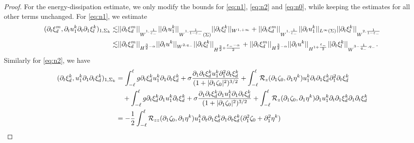 \documentclass[letterpaper,reqno,10pt,twoside]{amsart}
\theoremstyle{definition}
\theoremstyle{remark}
\def\p{\partial}
\begin{document}
\begin{proof}
		For the energy-dissipation estimate, we only modify the bounds for \eqref{eq:n1}, \eqref{eq:n2} and \eqref{eq:n0}, while keeping the estimates for all other terms unchanged. For \eqref{eq:n1}, we estimate 
		\begin{align}
			(\partial_{t}\xi_{d}^{m},\partial_{t}u_{1}^{k}\partial_{t}\partial_{1}\xi_{l}^{k})_{1,\Sigma_{k}}\lesssim& \vert \vert \partial_{t}\xi_{d}^{m}\vert \vert_{W^{1,\frac{1}{ \varepsilon_{-}}}}\vert \vert \partial_{t}u_{1}^{k}\vert \vert_{W^{1,\frac{1}{1-\varepsilon_{-}}}(\Sigma)}\vert \vert \partial_{t}\xi_{l}^{k}\vert \vert_{W^{1,+\infty}}
			+\vert \vert \partial_{t}\xi_{d}^{m}\vert \vert_{W^{1,\frac{1}{\varepsilon_{-}}}} \vert \vert  \p_{t}u_{1}^{k}\vert\vert_{L^{\infty}(\Sigma)}\vert \vert \partial_{t}\xi_{l}^{k}\vert \vert_{W^{2,\frac{1}{1-\varepsilon_{-}}}}\notag\\\lesssim& \vert \vert \partial_{t}\xi_{d}^{m}\vert \vert_{H^{\frac{3}{2}-\alpha}}\vert \vert \partial_{t}u^{k}\vert \vert_{W^{2,q_{-}}}\vert \vert \partial_{t}\xi_{l}^{k}\vert \vert_{H^{\frac{3}{2}+\frac{\varepsilon_{-}-\alpha}{2}}}+ \vert \vert \partial_{t}\xi_{d}^{m}\vert \vert_{H^{\frac{3}{2}-\alpha}}\vert \vert \partial_{t}u^{k}\vert \vert_{H^{1+\frac{\varepsilon_{-}}{2}}}\vert \vert \partial_{t}\xi_{l}^{k}\vert \vert_{W^{3-\frac{1}{q_{-}},q_{-}}}\label{eq:n3}.
		\end{align}
		Similarly for \eqref{eq:n2}, we have
		\begin{align}
			(\partial_{t}\xi_{d}^{k},u_{1}^{k}\partial_{1}\partial_{t}\xi_{d}^{k})_{1,\Sigma_{k}}\notag
			&=\int_{-\ell}^{\ell}g\partial_{t}\xi_{d}^{k}u_{1}^{k}\partial_{1}\partial_{t}\xi_{d}^{k}+\sigma\frac{\p_1\partial_{t}\xi_{d}^{k}u_{1}^{k}\partial_{1}^{2}\partial_{t}\xi_{d}^{k}}{(1+|\p_1\zeta_0|^2)^{3/2}}+\int_{-\ell}^{\ell}\mathcal{R}_{z}(\partial_{1}\zeta_{0},\partial_{1}\eta^{k})u_{1}^{k}\partial_{t}\partial_{1}\xi_{d}^{k}\partial_{1}^{2}\partial_{t}\xi_{d}^{k}\notag\\
			&\quad+\int_{-\ell}^{\ell}g\partial_{t}\xi_{d}^{k}\partial_{1}u_{1}^{k}\partial_{t}\xi_{d}^{k}+\sigma\frac{\p_1\partial_{t}\xi_{d}^{k}\partial_{1}u_{1}^{k}\partial_{1}\partial_{t}\xi_{d}^{k}}{(1+|\p_1\zeta_0|^2)^{3/2}}+\int_{-\ell}^{\ell}\mathcal{R}_{z}(\partial_{1}\zeta_{0},\partial_{1}\eta^{k})\partial_{1}u_{1}^{k}\partial_{t}\partial_{1}\xi_{d}^{k}\partial_{1}\partial_{t}\xi_{d}^{k}\notag\\
			&=-\frac{1}{2}\int_{-\ell}^{\ell}\mathcal{R}_{zz}(\partial_{1}\zeta_{0},\partial_{1}\eta^{k})u_{1}^{k}\partial_{t}\partial_{1}\xi_{d}^{k}\partial_{1}\partial_{t}\xi_{d}^{k}(\partial_{1}^{2}\zeta_{0}+\partial_{1}^{2}\eta^{k})\notag\\

\end{align}
\end{proof}
\end{document}
